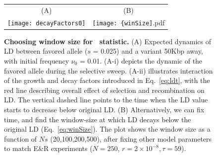 \begin{figure}[H]
	\centering
	\begin{tabular}{c|c}	
		(A)&(B)\\
		\texttt{[image: decayFactors0]}
		& 		\texttt{[image: \{winSize]}.pdf}
	\end{tabular}
	
	\caption{{\bf Choosing window size for \comale\ statistic.}
          (A) Expected dynamics of LD between favored allele ($s$ =
          0.025) and a variant 50Kbp away, with initial frequency
          $\nu_0$ = 0.01. (A-i) depicts the dynamic of the favored
          allele during the selective sweep. (A-ii) illustrates
          interaction of the growth and decay factors introduced in
          Eq.~\ref{eq:ldt}, with the red line describing overall
          effect of selection and recombination on LD. The vertical
          dashed line points to the time when the LD value starts to
          decrease below original LD. (B) Alternatively, we can fix
          time, and find the window-size at which LD decays below the
          original LD (Eq.~\ref{eq:winSize}). The plot shows the
          window size as a function of $Ns$ (20,100,200,500), after
          fixing other model parameters to match \dmel E\&R
          experiments ($N = 250$, $r = 2 \times 10^{−8}, \tau=59$).}
	\label{fig:winSize}
\end{figure}


